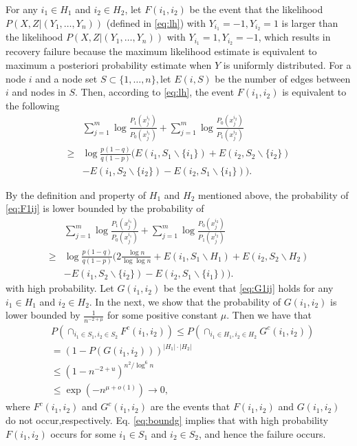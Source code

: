 \documentclass[conference]{IEEEtran}
\begin{document}
		For any $i_1\in H_1$ and $i_2\in H_2$, let $F(i_1,i_2)$ be the event that the likelihood $P(X,Z|(Y_1,\ldots,Y_n))$ (defined in \eqref{eq:lh}) with $Y_{i_1}=-1,Y_{i_2}=1$ is larger than the likelihood $P(X,Z|(Y_1,\ldots,Y_n))$ with $Y_{i_1}=1,Y_{i_2}=-1$, which results in  recovery failure because the maximum likelihood estimate is equivalent to maximum a posteriori probability estimate when $Y$ is uniformly distributed. For a node $i$ and a node set $S\subset\{1,\ldots,n\}, $let $E(i,S)$ be the number of edges between $i$ and nodes in $S$. Then, according to \eqref{eq:lh}, the event $F(i_1,i_2)$ is equivalent to  
		the following 
		\begin{align}
			&\sum_{j=1}^{m} \log \frac{P_1(x^{i_1}_{j})}{P_0(x^{i_1}_{j})}
			+\sum_{j=1}^{m} \log \frac{P_0(x^{i_2}_{j})}{P_1(x^{i_2}_{j})}\nonumber\\
			\ge &\log \frac{p(1-q)}{q(1-p)}(E(i_1, S_1 \backslash \{i_1\}) + E(i_2, S_2 \backslash \{i_2\})\nonumber\\
			&- E(i_1, S_2 \backslash \{i_2\}) - E(i_2, S_1 \backslash \{i_1\})) \label{eq:F1ij}.
		\end{align}
		
		By the definition and property of $H_1$ and $H_2$ mentioned above, the probability of \eqref{eq:F1ij} is lower bounded by the probability of
		\begin{align}
			&\sum_{j=1}^{m} \log \frac{P_1(x^{i_1}_{j})}{P_0(x^{i_1}_{j})}
			+\sum_{j=1}^{m} \log \frac{P_0(x^{i_2}_{j})}{P_1(x^{i_2}_{j})}\nonumber\\   
			\ge &\log \frac{p(1-q)}{q(1-p)}(2\frac{\log n}{\log\log n}+E(i_1, S_1 \backslash H_1) + E(i_2, S_2 \backslash H_2)\nonumber\\
			&- E(i_1, S_2 \backslash \{i_2\}) - E(i_2, S_1 \backslash \{i_1\})) \label{eq:G1ij}.
		\end{align}
		with high probability. Let $G(i_1,i_2)$ be the event that \eqref{eq:G1ij} holds for any $i_1\in H_1$ and $i_2\in H_2$. In the next, we show that
		the probability of $G(i_1,i_2)$ is lower bounded by $\frac{1}{n^{-2+\mu}}$ for some positive constant $\mu$. Then we have that 
		\begin{align}
			& P(\cap_{i_1\in S_1, i_2\in S_2} F^c(i_1,i_2)) \le P(\cap_{i_1\in H_1, i_2\in H_2} G^c(i_1,i_2)) \nonumber\\
			& = (1 - P(G(i_1,i_2)))^{|H_1|\cdot|H_2|}\nonumber\\
			& \leq (1-n^{-2+u})^{n^2/\log^6 n} \nonumber\\
			& \leq \exp(-n^{\mu+ o(1)}) \to 0, \label{eq:boundg}
		\end{align}
		where $F^c(i_1,i_2)$ and $G^c(i_1,i_2)$ are the events that $F(i_1,i_2)$ and $G(i_1,i_2)$ do not occur,respectively. Eq. \eqref{eq:boundg} implies that with high probability $F(i_1,i_2)$ occurs for some $i_1\in S_1$ and $i_2\in S_2$, and hence the failure occurs.
		
\end{document}

